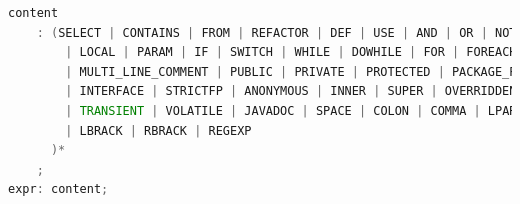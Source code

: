 \documentclass[12pt, letterpaper]{article}
\begin{document}
\begin{lstlisting}[language=Java]
content
    : (SELECT | CONTAINS | FROM | REFACTOR | DEF | USE | AND | OR | NOT | CLASS_NV | CLASS_V | METHOD | INSTANCE
        | LOCAL | PARAM | IF | SWITCH | WHILE | DOWHILE | FOR | FOREACH | TERNARY | SYNCHRONIZED | SINGLE_LINE_COMMENT
        | MULTI_LINE_COMMENT | PUBLIC | PRIVATE | PROTECTED | PACKAGE_PRIVATE | STATIC | FINAL | ABSTRACT | CATCH_ALL
        | INTERFACE | STRICTFP | ANONYMOUS | INNER | SUPER | OVERRIDDEN | THROWS | RENAME | CHANGE_PARAMETERS
        | TRANSIENT | VOLATILE | JAVADOC | SPACE | COLON | COMMA | LPAREN | RPAREN | IDENTIFIER_NAME | NUMBER | S_QUOTE
        | LBRACK | RBRACK | REGEXP
      )*
    ;
expr: content;
\end{lstlisting}
\end{document}
